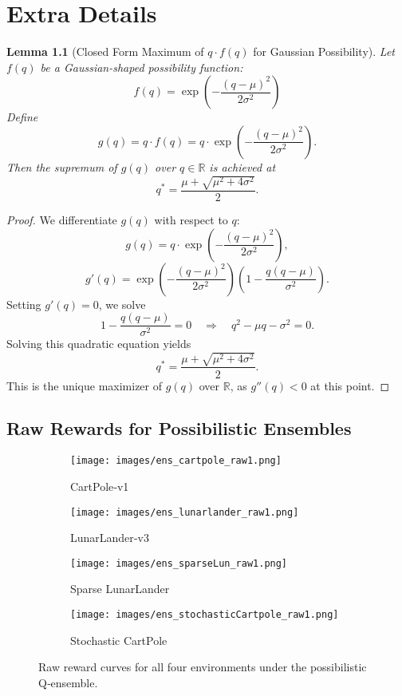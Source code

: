 \documentclass[11pt,a4paper]{report}
\newtheorem{lemma}{Lemma}
\begin{document}
\chapter{Extra Details}

\begin{lemma}[Closed Form Maximum of $q \cdot f(q)$ for Gaussian Possibility]
\label{lem:max_expected_gauss}
Let $f(q)$ be a Gaussian-shaped possibility function: 
\[ f(q) = \exp\left(-\frac{(q - \mu)^2}{2\sigma^2} \right) \]
Define
\[
g(q) = q \cdot f(q) = q \cdot \exp\left(-\frac{(q - \mu)^2}{2\sigma^2} \right).
\]
Then the supremum of \( g(q) \) over \( q \in \mathbb{R} \) is achieved at
\[
q^* = \frac{\mu + \sqrt{\mu^2 + 4\sigma^2}}{2}.
\]
\end{lemma}

\begin{proof}
We differentiate \( g(q) \) with respect to \( q \):
\[
g(q) = q \cdot \exp\left(-\frac{(q - \mu)^2}{2\sigma^2} \right),
\]
\[
g'(q) = \exp\left(-\frac{(q - \mu)^2}{2\sigma^2} \right) \left( 1 - \frac{q(q - \mu)}{\sigma^2} \right).
\]
Setting \( g'(q) = 0 \), we solve
\[
1 - \frac{q(q - \mu)}{\sigma^2} = 0 \quad \Rightarrow \quad q^2 - \mu q - \sigma^2 = 0.
\]
Solving this quadratic equation yields
\[
q^* = \frac{\mu + \sqrt{\mu^2 + 4\sigma^2}}{2}.
\]
This is the unique maximizer of \( g(q) \) over \( \mathbb{R} \), as \( g''(q) < 0 \) at this point.
\end{proof}

\section*{Raw Rewards for Possibilistic Ensembles} \label{sec:posens-raw}
\begin{figure}[H]
  \centering
  \begin{subfigure}[b]{0.45\textwidth}
    \texttt{[image: images/ens\_cartpole\_raw1.png]}
    \caption{CartPole‐v1}
  \end{subfigure}
  \hfill
  \begin{subfigure}[b]{0.45\textwidth}
    \texttt{[image: images/ens\_lunarlander\_raw1.png]}
    \caption{LunarLander‐v3}
  \end{subfigure}
  \vspace{1em}

  \begin{subfigure}[b]{0.45\textwidth}
    \texttt{[image: images/ens\_sparseLun\_raw1.png]}
    \caption{Sparse LunarLander}
  \end{subfigure}
  \hfill
  \begin{subfigure}[b]{0.45\textwidth}
    \texttt{[image: images/ens\_stochasticCartpole\_raw1.png]}
    \caption{Stochastic CartPole}
  \end{subfigure}

  \caption{Raw reward curves for all four environments under the possibilistic Q‐ensemble.}
  \label{fig:ens_raw}
\end{figure}
\end{document}
